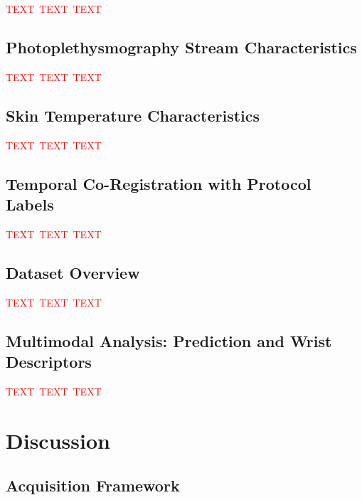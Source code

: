 \documentclass[sensors,article,submit,pdftex,moreauthors]{Definitions/mdpi}
\newcommand{\ph}{\textcolor{red}{TEXT}}
\newcommand{\phh}{\ph{}\ \ph{}\ \ph{}}
\begin{document}
\phh



\subsection{Photoplethysmography Stream Characteristics}



\phh



\subsection{Skin Temperature Characteristics}



\phh



\subsection{Temporal Co-Registration with Protocol Labels}



\phh



\subsection{Dataset Overview}



\phh



\subsection{Multimodal Analysis: Prediction and Wrist Descriptors}



\phh




\section{Discussion}



\subsection{Acquisition Framework}
\end{document}

